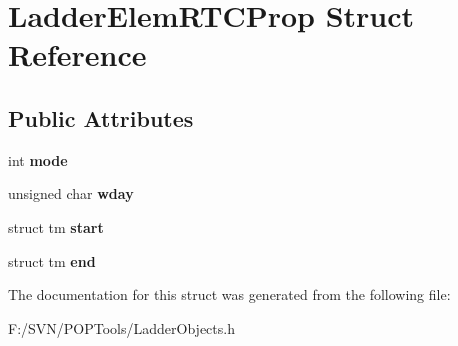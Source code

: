\hypertarget{struct_ladder_elem_r_t_c_prop}{\section{Ladder\-Elem\-R\-T\-C\-Prop Struct Reference}
\label{struct_ladder_elem_r_t_c_prop}
}
\subsection*{Public Attributes}
\begin{DoxyCompactItemize}
\item 
\hypertarget{struct_ladder_elem_r_t_c_prop_a971c22761bec231e9ddb4807a0b691be}{int {\bfseries mode}}\label{struct_ladder_elem_r_t_c_prop_a971c22761bec231e9ddb4807a0b691be}

\item 
\hypertarget{struct_ladder_elem_r_t_c_prop_a332dfcdec68fee5d34a8970197f24fb4}{unsigned char {\bfseries wday}}\label{struct_ladder_elem_r_t_c_prop_a332dfcdec68fee5d34a8970197f24fb4}

\item 
\hypertarget{struct_ladder_elem_r_t_c_prop_a3fe9a0751cdc950135e2f486c89f801e}{struct tm {\bfseries start}}\label{struct_ladder_elem_r_t_c_prop_a3fe9a0751cdc950135e2f486c89f801e}

\item 
\hypertarget{struct_ladder_elem_r_t_c_prop_a4e2d4d4218a517b6400ea2e38fe174e7}{struct tm {\bfseries end}}\label{struct_ladder_elem_r_t_c_prop_a4e2d4d4218a517b6400ea2e38fe174e7}

\end{DoxyCompactItemize}


The documentation for this struct was generated from the following file\-:\begin{DoxyCompactItemize}
\item 
F\-:/\-S\-V\-N/\-P\-O\-P\-Tools/Ladder\-Objects.\-h\end{DoxyCompactItemize}
